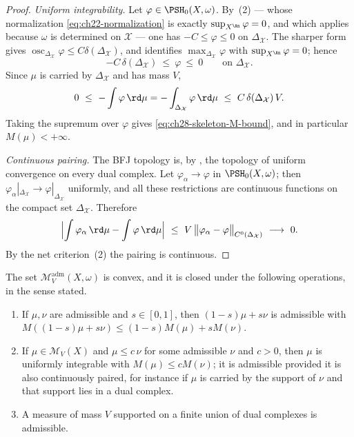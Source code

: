 \begin{proof}
\emph{Uniform integrability.}  Let $\varphi\in\PSH_0(X,\omega)$.  By
\,(2) --- whose normalization
\eqref{eq:ch22-normalization} is exactly
$\sup_{X^{\An}}\varphi=0$, and which applies because $\omega$ is
determined on $\mathcal X$ --- one has $-C\leq\varphi\leq0$ on
$\Delta_{\mathcal X}$.  The sharper form
 gives
$\operatorname{osc}_{\Delta_{\mathcal X}}\varphi\leq
C\delta(\Delta_{\mathcal X})$, and
 identifies
$\max_{\Delta_{\mathcal X}}\varphi$ with
$\sup_{X^{\An}}\varphi=0$; hence
\[
 -C\,\delta(\Delta_{\mathcal X})\ \leq\ \varphi\ \leq\ 0
 \qquad\text{on }\Delta_{\mathcal X}.
\]
Since $\mu$ is carried by $\Delta_{\mathcal X}$ and has mass $V$,
\[
 0\ \leq\ -\int\varphi\,\rd\mu
 =-\int_{\Delta_{\mathcal X}}\varphi\,\rd\mu
 \ \leq\ C\,\delta(\Delta_{\mathcal X})\,V .
\]
Taking the supremum over $\varphi$ gives
\eqref{eq:ch28-skeleton-M-bound}, and in particular $M(\mu)<+\infty$.

\emph{Continuous pairing.}  The BFJ topology is, by
, the topology of uniform convergence on
every dual complex.  Let $\varphi_\alpha\to\varphi$ in
$\PSH_0(X,\omega)$; then
$\varphi_\alpha|_{\Delta_{\mathcal X}}\to\varphi|_{\Delta_{\mathcal X}}$
uniformly, and all these restrictions are continuous functions on the
compact set $\Delta_{\mathcal X}$.  Therefore
\[
 \Bigl|\int\varphi_\alpha\,\rd\mu-\int\varphi\,\rd\mu\Bigr|
 \ \leq\ V\,\bigl\lVert
   \varphi_\alpha-\varphi\bigr\rVert_{C^0(\Delta_{\mathcal X})}
 \ \longrightarrow\ 0 .
\]
By the net criterion \,(2) the pairing is
continuous.
\end{proof}

\begin{proposition}
\label{prop:ch28-admissible-calculus}
The set $\mathcal M^{\mathrm{adm}}_V(X,\omega)$ is convex, and it is
closed under the following operations, in the sense stated.
\begin{enumerate}
\item\label{itm:ch28-admcalc:convex}
 If $\mu,\nu$ are admissible and $s\in[0,1]$, then
 $(1-s)\mu+s\nu$ is admissible with
 $M((1-s)\mu+s\nu)\leq(1-s)M(\mu)+sM(\nu)$.
\item\label{itm:ch28-admcalc:dominated}
 If $\mu\in\mathcal M_V(X)$ and $\mu\leq c\,\nu$ for some admissible
 $\nu$ and $c>0$, then $\mu$ is uniformly integrable with
 $M(\mu)\leq cM(\nu)$; it is admissible provided it is also continuously
 paired, for instance if $\mu$ is carried by the support of $\nu$ and
 that support lies in a dual complex.
\item\label{itm:ch28-admcalc:union}
 A measure of mass $V$ supported on a finite union of dual complexes is
 admissible.
\end{enumerate}
\end{proposition}

